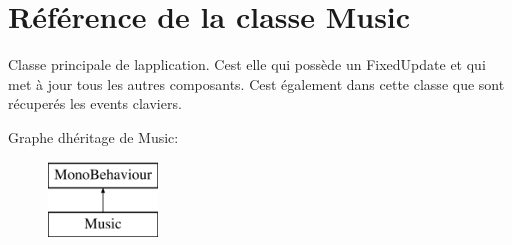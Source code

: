 \hypertarget{class_music}{}\section{Référence de la classe Music}
\label{class_music}


Classe principale de l\textquotesingle{}application. C\textquotesingle{}est elle qui possède un Fixed\+Update et qui met à jour tous les autres composants. C\textquotesingle{}est également dans cette classe que sont récuperés les events claviers.  


Graphe d\textquotesingle{}héritage de Music\+:\begin{figure}[H]
\begin{center}
\leavevmode
\includegraphics[height=2.000000cm]{class_music}
\end{center}
\end{figure}
